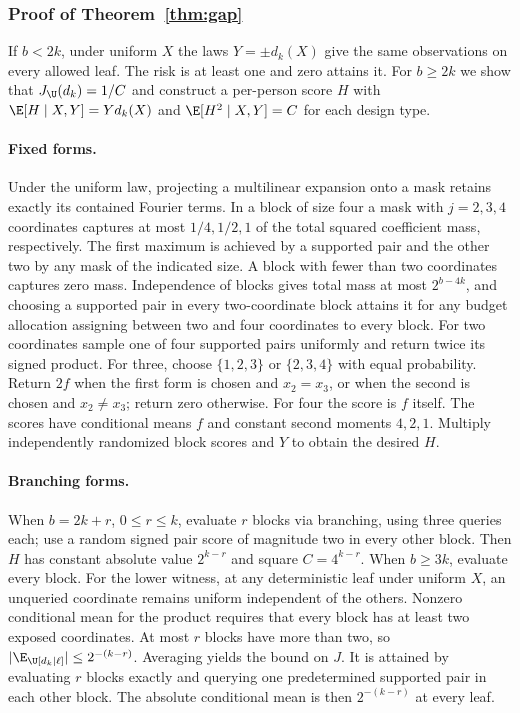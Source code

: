 \subsubsection{Proof of Theorem~\ref{thm:gap}}\label{app:gap}
If $b<2k$, under uniform $X$ the laws $Y=\pm d_k(X)$ give the same observations on every allowed leaf. The risk is at least one and zero attains it. For $b\ge2k$ we show that $J_\U(d_k)=1/C$ and construct a per-person score $H$ with $\E[H\mid X,Y]=Yd_k(X)$ and $\E[H^2\mid X,Y]=C$ for each design type.

\paragraph{Fixed forms.}
Under the uniform law, projecting a multilinear expansion onto a mask retains exactly its contained Fourier terms. In a block of size four a mask with $j=2,3,4$ coordinates captures at most $1/4,1/2,1$ of the total squared coefficient mass, respectively. The first maximum is achieved by a supported pair and the other two by any mask of the indicated size. A block with fewer than two coordinates captures zero mass. Independence of blocks gives total mass at most $2^{b-4k}$, and choosing a supported pair in every two-coordinate block attains it for any budget allocation assigning between two and four coordinates to every block. For two coordinates sample one of four supported pairs uniformly and return twice its signed product. For three, choose $\{1,2,3\}$ or $\{2,3,4\}$ with equal probability. Return $2f$ when the first form is chosen and $x_2=x_3$, or when the second is chosen and $x_2\ne x_3$; return zero otherwise. For four the score is $f$ itself. The scores have conditional means $f$ and constant second moments $4,2,1$. Multiply independently randomized block scores and $Y$ to obtain the desired $H$.

\paragraph{Branching forms.}
When $b=2k+r$, $0\le r\le k$, evaluate $r$ blocks via branching, using three queries each; use a random signed pair score of magnitude two in every other block. Then $H$ has constant absolute value $2^{k-r}$ and square $C=4^{k-r}$. When $b\ge3k$, evaluate every block. For the lower witness, at any deterministic leaf under uniform $X$, an unqueried coordinate remains uniform independent of the others. Nonzero conditional mean for the product requires that every block has at least two exposed coordinates. At most $r$ blocks have more than two, so $|\E_\U[d_k\mid\ell]|\le2^{-(k-r)}$. Averaging yields the bound on $J$. It is attained by evaluating $r$ blocks exactly and querying one predetermined supported pair in each other block. The absolute conditional mean is then $2^{-(k-r)}$ at every leaf.

